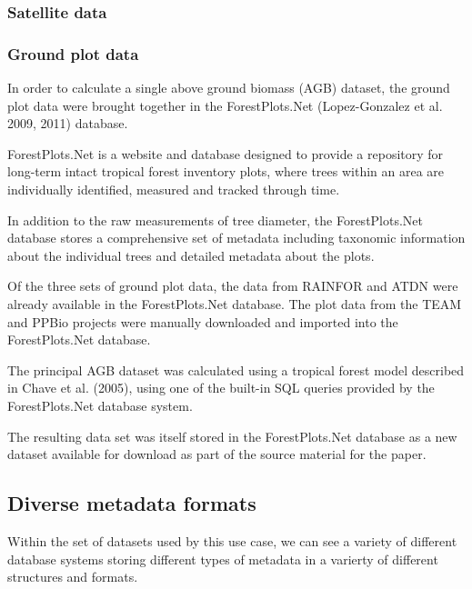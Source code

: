 \documentclass{article}
\begin{document}
\subsubsection{Satellite data}




\subsubsection{Ground plot data}

In order to calculate a single above ground biomass (AGB) dataset,
the ground plot data were brought together in the ForestPlots.Net
(Lopez-Gonzalez et al. 2009, 2011)
database.

ForestPlots.Net is a website and database designed to provide a repository for
long-term intact tropical forest inventory plots, where trees within an area are
individually identified, measured and tracked through time.

In addition to the raw measurements of tree diameter, the ForestPlots.Net database
stores a comprehensive set of metadata including taxonomic information about
the individual trees and detailed metadata about the plots.

Of the three sets of ground plot data, the data from RAINFOR and ATDN were
already available in the ForestPlots.Net database. The plot data from the TEAM
and PPBio projects were manually downloaded and imported into the
ForestPlots.Net database.

The principal AGB dataset was calculated using a tropical forest model described in Chave et al. (2005),
using one of the built-in SQL queries provided by the ForestPlots.Net database
system.

The resulting data set was itself stored in the ForestPlots.Net database as
a new dataset available for download as part of the source material for the paper.

\subsection{Diverse metadata formats}

Within the set of datasets used by this use case, we can see a variety of
different database systems storing different types of metadata in a varierty of
different structures and formats.
\end{document}
